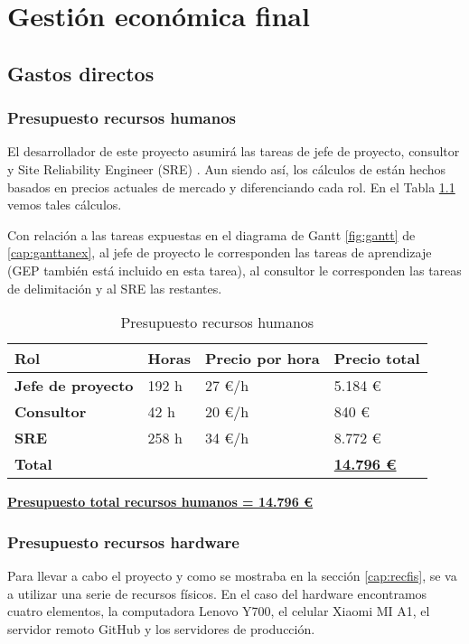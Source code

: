 \chapter{Gestión económica final}\label{cap:gestionec}
\section{Gastos directos}
\subsection{Presupuesto recursos humanos}
El desarrollador de este proyecto asumirá las tareas de jefe de proyecto, consultor y Site Reliability Engineer (SRE) \cite{Tfg:sre}. Aun siendo así, los cálculos de están hechos basados en precios actuales de mercado y diferenciando cada rol. En el Tabla \ref{tab:preprechum} vemos tales cálculos.

Con relación a las tareas expuestas en el diagrama de Gantt \ref{fig:gantt} de \ref{cap:ganttanex}, al jefe de proyecto le corresponden las tareas de aprendizaje (GEP también está incluido en esta tarea), al consultor le corresponden las tareas de delimitación y al SRE las restantes.


\begin{table}[H]\label{tab:preprechum}
	\centering
	\begin{tabular}{|l|l|l|l|}
		\hline
		\textbf{Rol}              & \textbf{Horas} & \textbf{Precio por hora}         & \textbf{Precio total}  \\ \hline
		\textbf{Jefe de proyecto} & 192 h          & 27 €/h \cite{Tfg:projectmanager} & 5.184 €                \\ \hline
		\textbf{Consultor}        & 42 h           & 20 €/h \cite{Tfg:itconsultant}   & 840 €                  \\ \hline
		\textbf{SRE}              & 258 h          & 34 €/h \cite{Tfg:sresalary}      & 8.772 €                \\ \hline
		\multicolumn{3}{|l|}{\textbf{Total}} & \textbf{\underline{14.796 €}}                                   \\ \hline
	\end{tabular}
	\caption{Presupuesto recursos humanos}
\end{table}


\textbf{\underline{Presupuesto total recursos humanos = 14.796 €}}

\subsection{Presupuesto recursos hardware}\label{sec:presrechard}
Para llevar a cabo el proyecto y como se mostraba en la sección \ref{cap:recfis}, se va a utilizar una serie de recursos físicos. En el caso del hardware encontramos cuatro elementos, la computadora Lenovo Y700, el celular Xiaomi MI A1, el servidor remoto GitHub y los servidores de producción. 

